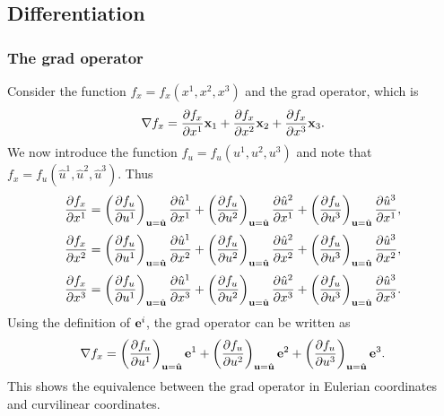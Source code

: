 \documentclass[11pt]{article}
\newcommand{\uhat}{\hat{u}}
\begin{document}
\begin{itemize}
\end{itemize}

\subsection{Differentiation}
\subsubsection{The grad operator}
Consider the function $f_x = f_x(x^1, x^2, x^3)$ and the grad operator, which is  
\begin{equation}
    \nabla f_x = \frac{\partial f_x}{\partial x^1} \mathbf{x}_1 + \frac{\partial f_x}{\partial x^2} \mathbf{x}_2 + \frac{\partial f_x}{\partial x^3} \mathbf{x}_3.
\end{equation}
We now introduce the function $f_u = f_u(u^1,u^2,u^3)$ and note that $f_x = f_u(\uhat^1,\uhat^2,\uhat^3)$. Thus
\begin{equation}
    \frac{\partial f_x}{\partial x^1} = \left ( \frac{ \partial f_u}{\partial u^1} \right)_{\uvec = \hat{\uvec}}        \frac{\partial \uhat^1}{\partial x^1} + 
                     \left ( \frac{ \partial f_u}{\partial u^2} \right)_{\uvec = \hat{\uvec}} \frac{\partial \uhat^2}{\partial x^1} +
                     \left ( \frac{ \partial f_u}{\partial u^3} \right)_{\uvec = \hat{\uvec}} \frac{\partial \uhat^3}{\partial x^1}, 
\end{equation}
\begin{equation}
    \frac{\partial f_x}{\partial x^2} = \left ( \frac{ \partial f_u}{\partial u^1} \right)_{\uvec = \hat{\uvec}} \frac{\partial \uhat^1}{\partial x^2} + 
                     \left ( \frac{ \partial f_u}{\partial u^2} \right)_{\uvec = \hat{\uvec}} \frac{\partial \uhat^2}{\partial x^2} +
                     \left ( \frac{ \partial f_u}{\partial u^3} \right)_{\uvec = \hat{\uvec}} \frac{\partial \uhat^3}{\partial x^2},
\end{equation}
\begin{equation}
    \frac{\partial f_x}{\partial x^3} = \left ( \frac{ \partial f_u}{\partial u^1} \right)_{\uvec = \hat{\uvec}} \frac{\partial \uhat^1}{\partial x^3} + 
                     \left ( \frac{ \partial f_u}{\partial u^2} \right)_{\uvec = \hat{\uvec}} \frac{\partial \uhat^2}{\partial x^3} +
                     \left ( \frac{ \partial f_u}{\partial u^3} \right)_{\uvec = \hat{\uvec}} \frac{\partial \uhat^3}{\partial x^3} .
\end{equation}
Using the definition of $\mathbf{e}^i$, the grad operator can be written as
\begin{equation}
    \nabla f_x = \left ( \frac{\partial f_u }{\partial u^1} \right )_{\mathbf{u} = \hat{\mathbf{u}}} \mathbf{e}^1 + \left ( \frac{\partial f_u }{\partial u^2} \right )_{\mathbf{u} = \hat{\mathbf{u}}} \mathbf{e}^2 + \left ( \frac{\partial f_u }{\partial u^3} \right )_{\mathbf{u} = \hat{\mathbf{u}}} \mathbf{e}^3 .
\end{equation}
This shows the equivalence between the grad operator in Eulerian coordinates and curvilinear coordinates.
\end{document}
